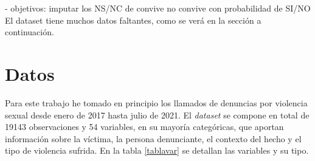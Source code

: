 \documentclass[10 pt]{article}
\begin{document}
- objetivos: imputar los NS/NC de convive no convive con probabilidad de SI/NO 
El dataset tiene muchos datos faltantes, como se verá en la sección  a continuación.


\section*{Datos}\label{datos}


Para este trabajo he tomado en principio los llamados de denuncias por violencia sexual desde enero de 2017 hasta julio de 2021. El \textit{dataset} se compone en total de 19143 observaciones y 54 variables, en su mayoría categóricas, que aportan información sobre la víctima, la persona denunciante, el contexto del hecho y el tipo de violencia sufrida. En la tabla \ref{tablavar} se detallan las variables y su tipo.
\end{document}
